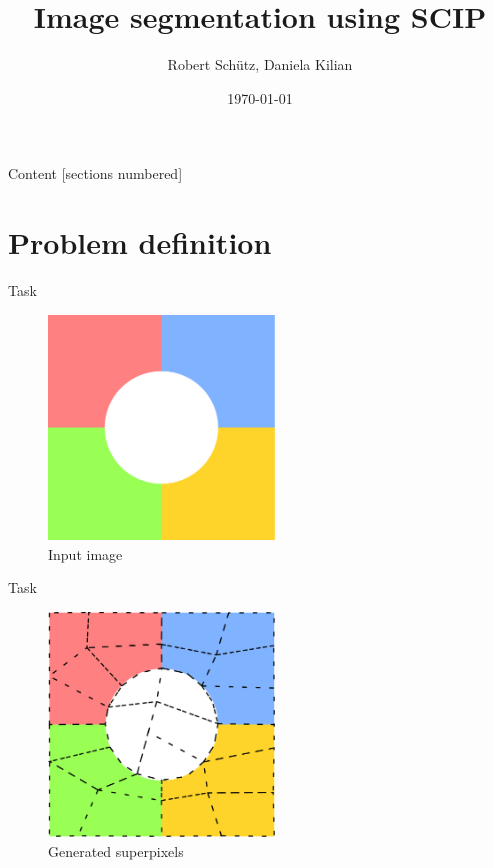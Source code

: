 \documentclass[fleqn]{beamer}
\title{Image segmentation using SCIP}
\subtitle{}
\date{\today}
\author{Robert Schütz, Daniela Kilian}
\institute{Advanced project SS 2017}
\begin{document}
	\maketitle
	
	\begin{frame}{Content}
		[sections numbered]
		\tableofcontents
	\end{frame}

    \section{Problem definition}
	\begin{frame}{Task}
		\begin{figure}
            \begin{center}
                \includegraphics[width=60mm]{input}
                \caption{Input image}
            \end{center}
		\end{figure}
	\end{frame}

    \begin{frame}{Task}
        \begin{figure}
            \begin{center}
               \includegraphics[width=60mm]{superpixels}
               \caption{Generated superpixels}
           \end{center}
        \end{figure}
    \end{frame}
\end{document}
